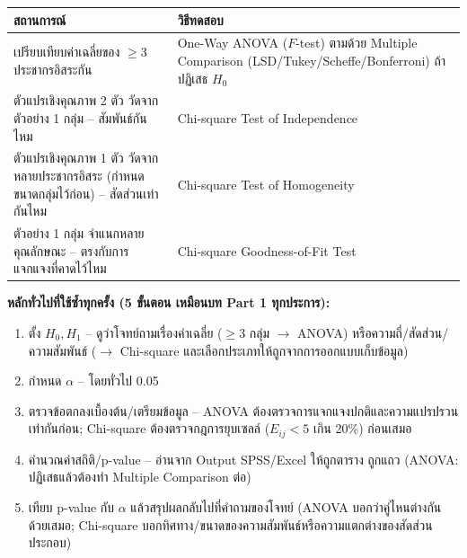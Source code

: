 \documentclass[10pt]{extarticle}
\begin{document}
\begin{center}\small
\begin{tabular}{@{}p{5.3cm}p{7.6cm}@{}}
\toprule
\textbf{สถานการณ์} & \textbf{วิธีทดสอบ}\\\midrule
เปรียบเทียบค่าเฉลี่ยของ $\ge3$ ประชากรอิสระกัน & One-Way ANOVA ($F$-test) ตามด้วย Multiple Comparison (LSD/Tukey/Scheffe/Bonferroni) ถ้าปฏิเสธ $H_0$\\
ตัวแปรเชิงคุณภาพ 2 ตัว วัดจากตัวอย่าง 1 กลุ่ม -- สัมพันธ์กันไหม & Chi-square Test of Independence\\
ตัวแปรเชิงคุณภาพ 1 ตัว วัดจากหลายประชากรอิสระ (กำหนดขนาดกลุ่มไว้ก่อน) -- สัดส่วนเท่ากันไหม & Chi-square Test of Homogeneity\\
ตัวอย่าง 1 กลุ่ม จำแนกหลายคุณลักษณะ -- ตรงกับการแจกแจงที่คาดไว้ไหม & Chi-square Goodness-of-Fit Test\\
\bottomrule
\end{tabular}
\end{center}

\begin{formulabox}
\textbf{หลักทั่วไปที่ใช้ซ้ำทุกครั้ง (5 ขั้นตอน เหมือนบท Part 1 ทุกประการ):}
\begin{enumerate}
\item ตั้ง $H_0,H_1$ -- ดูว่าโจทย์ถามเรื่องค่าเฉลี่ย ($\ge3$ กลุ่ม $\to$ ANOVA) หรือความถี่/สัดส่วน/ความสัมพันธ์ ($\to$ Chi-square และเลือกประเภทให้ถูกจากการออกแบบเก็บข้อมูล)
\item กำหนด $\alpha$ -- โดยทั่วไป 0.05
\item ตรวจข้อตกลงเบื้องต้น/เตรียมข้อมูล -- ANOVA ต้องตรวจการแจกแจงปกติและความแปรปรวนเท่ากันก่อน; Chi-square ต้องตรวจกฎการยุบเซลล์ ($E_{ij}<5$ เกิน 20\%) ก่อนเสมอ
\item คำนวณค่าสถิติ/p-value -- อ่านจาก Output SPSS/Excel ให้ถูกตาราง ถูกแถว (ANOVA: ปฏิเสธแล้วต้องทำ Multiple Comparison ต่อ)
\item เทียบ p-value กับ $\alpha$ แล้วสรุปผลกลับไปที่คำถามของโจทย์ (ANOVA บอกว่าคู่ไหนต่างกันด้วยเสมอ; Chi-square บอกทิศทาง/ขนาดของความสัมพันธ์หรือความแตกต่างของสัดส่วนประกอบ)
\end{enumerate}
\end{formulabox}
\end{document}
